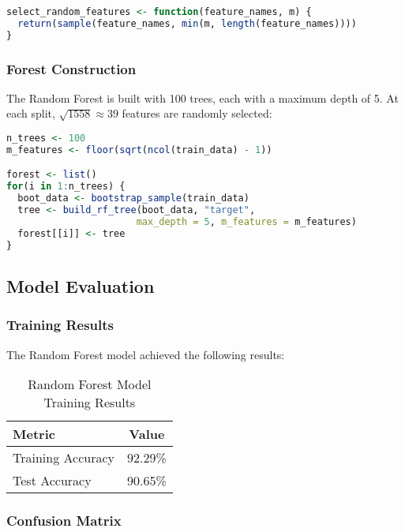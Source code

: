 \begin{lstlisting}[language=R, caption=Random Feature Selection]
select_random_features <- function(feature_names, m) {
  return(sample(feature_names, min(m, length(feature_names))))
}
\end{lstlisting}

\subsubsection{Forest Construction}

The Random Forest is built with 100 trees, each with a maximum depth of 5. At each split, $\sqrt{1558} \approx 39$ features are randomly selected:

\begin{lstlisting}[language=R, caption=Random Forest Training]
n_trees <- 100
m_features <- floor(sqrt(ncol(train_data) - 1))

forest <- list()
for(i in 1:n_trees) {
  boot_data <- bootstrap_sample(train_data)
  tree <- build_rf_tree(boot_data, "target", 
                       max_depth = 5, m_features = m_features)
  forest[[i]] <- tree
}
\end{lstlisting}

\subsection{Model Evaluation}

\subsubsection{Training Results}

The Random Forest model achieved the following results:

\begin{table}[h]
\centering
\caption{Random Forest Model Training Results}
\begin{tabular}{|l|c|}
\hline
\textbf{Metric} & \textbf{Value} \\
\hline
Training Accuracy & 92.29\% \\
Test Accuracy & 90.65\% \\
\hline
\end{tabular}
\end{table}

\subsubsection{Confusion Matrix}

